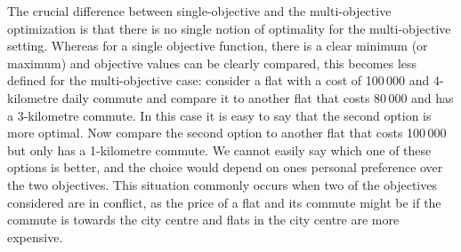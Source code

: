 The crucial difference between single-objective and the multi-objective optimization is that there is no single notion of optimality for the multi-objective setting.
Whereas for a single objective function, there is a clear minimum (or maximum) and objective values can be clearly compared, this becomes less defined for the multi-objective case:
consider a flat with a cost of 100\,000 \texteuro{} and 4-kilometre daily commute and compare it to another flat that costs 80\,000 \texteuro{} and has a 3-kilometre commute.
In this case it is easy to say that the second option is more optimal.
Now compare the second option to another flat that costs 100\,000 \texteuro{} but only has a 1-kilometre commute.
We cannot easily say which one of these options is better, and the choice would depend on ones personal preference over the two objectives.
This situation commonly occurs when two of the objectives considered are in conflict, as the price of a flat and its commute might be if the commute is towards the city centre and flats in the city centre are more expensive.

\lipsum[5-5]

\lipsum[4-4]

\lipsum[6-6]

\lipsum[7-7]

\lipsum[7-7]

\lipsum[8-8]

\lipsum[9-9]

\lipsum[10-10]

\lipsum[11-11]

\lipsum[12-12]